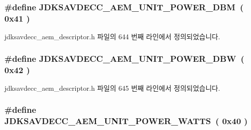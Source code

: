 \subsubsection[{\texorpdfstring{J\+D\+K\+S\+A\+V\+D\+E\+C\+C\+\_\+\+A\+E\+M\+\_\+\+U\+N\+I\+T\+\_\+\+P\+O\+W\+E\+R\+\_\+\+D\+BM}{JDKSAVDECC_AEM_UNIT_POWER_DBM}}]{\setlength{\rightskip}{0pt plus 5cm}\#define J\+D\+K\+S\+A\+V\+D\+E\+C\+C\+\_\+\+A\+E\+M\+\_\+\+U\+N\+I\+T\+\_\+\+P\+O\+W\+E\+R\+\_\+\+D\+BM~( 0x41 )}\hypertarget{group__units_ga950d3e4aceb42cafda98b0e4ded0e28c}{}\label{group__units_ga950d3e4aceb42cafda98b0e4ded0e28c}


jdksavdecc\+\_\+aem\+\_\+descriptor.\+h 파일의 644 번째 라인에서 정의되었습니다.

\subsubsection[{\texorpdfstring{J\+D\+K\+S\+A\+V\+D\+E\+C\+C\+\_\+\+A\+E\+M\+\_\+\+U\+N\+I\+T\+\_\+\+P\+O\+W\+E\+R\+\_\+\+D\+BW}{JDKSAVDECC_AEM_UNIT_POWER_DBW}}]{\setlength{\rightskip}{0pt plus 5cm}\#define J\+D\+K\+S\+A\+V\+D\+E\+C\+C\+\_\+\+A\+E\+M\+\_\+\+U\+N\+I\+T\+\_\+\+P\+O\+W\+E\+R\+\_\+\+D\+BW~( 0x42 )}\hypertarget{group__units_ga467509717bbe3efac22c13207c929584}{}\label{group__units_ga467509717bbe3efac22c13207c929584}


jdksavdecc\+\_\+aem\+\_\+descriptor.\+h 파일의 645 번째 라인에서 정의되었습니다.

\subsubsection[{\texorpdfstring{J\+D\+K\+S\+A\+V\+D\+E\+C\+C\+\_\+\+A\+E\+M\+\_\+\+U\+N\+I\+T\+\_\+\+P\+O\+W\+E\+R\+\_\+\+W\+A\+T\+TS}{JDKSAVDECC_AEM_UNIT_POWER_WATTS}}]{\setlength{\rightskip}{0pt plus 5cm}\#define J\+D\+K\+S\+A\+V\+D\+E\+C\+C\+\_\+\+A\+E\+M\+\_\+\+U\+N\+I\+T\+\_\+\+P\+O\+W\+E\+R\+\_\+\+W\+A\+T\+TS~( 0x40 )}\hypertarget{group__units_gaeff6eb968481c1891ebc5e69534a8318}{}\label{group__units_gaeff6eb968481c1891ebc5e69534a8318}


